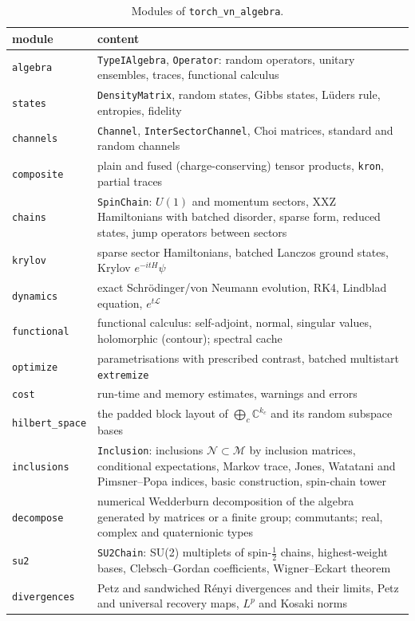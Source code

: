 \documentclass[11pt]{article}
\newcommand{\C}{\mathbb{C}}
\newcommand{\M}{\mathcal{M}}
\begin{document}
\begin{table}[h]
\centering\small
\begin{tabular}{lp{}}
\toprule
module & content \\
\midrule
\texttt{algebra} & \texttt{TypeIAlgebra}, \texttt{Operator}: random operators, unitary ensembles, traces,
functional calculus\\
\texttt{states} & \texttt{DensityMatrix}, random states, Gibbs states, Lüders rule, entropies, fidelity\\
\texttt{channels} & \texttt{Channel}, \texttt{InterSectorChannel}, Choi matrices, standard and random channels\\
\texttt{composite} & plain and fused (charge-conserving) tensor products, \texttt{kron}, partial traces\\
\texttt{chains} & \texttt{SpinChain}: $U(1)$ and momentum sectors, XXZ Hamiltonians with batched disorder,
sparse form, reduced states, jump operators between sectors\\
\texttt{krylov} & sparse sector Hamiltonians, batched Lanczos ground states, Krylov $e^{-itH}\psi$\\
\texttt{dynamics} & exact Schrödinger/von Neumann evolution, RK4, Lindblad equation, $e^{t\mathcal L}$\\
\texttt{functional} & functional calculus: self-adjoint, normal, singular values, holomorphic (contour); spectral cache\\
\texttt{optimize} & parametrisations with prescribed contrast, batched multistart \texttt{extremize}\\
\texttt{cost} & run-time and memory estimates, warnings and errors\\
\texttt{hilbert\_space} & the padded block layout of $\bigoplus_c\C^{k_c}$ and its random subspace bases\\
\texttt{inclusions} & \texttt{Inclusion}: inclusions $\mathcal N\subset\M$ by inclusion matrices, conditional expectations,
Markov trace, Jones, Watatani and Pimsner--Popa indices, basic construction, spin-chain tower\\
\texttt{decompose} & numerical Wedderburn decomposition of the algebra generated by matrices or a finite group; commutants;
real, complex and quaternionic types\\
\texttt{su2} & \texttt{SU2Chain}: SU(2) multiplets of spin-$\frac12$ chains, highest-weight bases, Clebsch--Gordan
coefficients, Wigner--Eckart theorem\\
\texttt{divergences} & Petz and sandwiched Rényi divergences and their limits, Petz and universal recovery maps,
$L^p$ and Kosaki norms\\
\bottomrule
\end{tabular}
\caption{Modules of \texttt{torch\_vn\_algebra}.}
\label{tab:modules}
\end{table}
\end{document}
